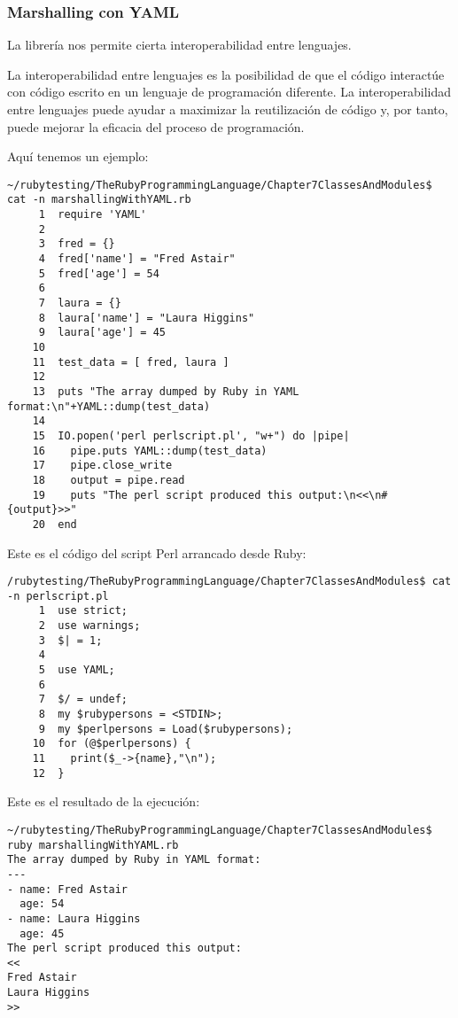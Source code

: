 \subsubsection{Marshalling con YAML}
\label{section:YAML}

La librería  nos permite cierta interoperabilidad entre lenguajes.

La interoperabilidad entre lenguajes es la posibilidad de que el código interactúe con código escrito en un lenguaje de programación diferente. 
La interoperabilidad entre lenguajes puede ayudar a maximizar la reutilización de código y, por tanto, puede mejorar la eficacia del proceso de programación.

Aquí tenemos un ejemplo:

\begin{verbatim}
~/rubytesting/TheRubyProgrammingLanguage/Chapter7ClassesAndModules$ cat -n marshallingWithYAML.rb 
     1  require 'YAML'
     2  
     3  fred = {}
     4  fred['name'] = "Fred Astair"
     5  fred['age'] = 54
     6  
     7  laura = {}
     8  laura['name'] = "Laura Higgins"
     9  laura['age'] = 45
    10  
    11  test_data = [ fred, laura ]
    12  
    13  puts "The array dumped by Ruby in YAML format:\n"+YAML::dump(test_data)
    14  
    15  IO.popen('perl perlscript.pl', "w+") do |pipe|
    16    pipe.puts YAML::dump(test_data)
    17    pipe.close_write  
    18    output = pipe.read
    19    puts "The perl script produced this output:\n<<\n#{output}>>"
    20  end
\end{verbatim}
Este es el código del script Perl arrancado desde Ruby:
\begin{verbatim}
/rubytesting/TheRubyProgrammingLanguage/Chapter7ClassesAndModules$ cat -n perlscript.pl 
     1  use strict;
     2  use warnings;
     3  $| = 1;
     4  
     5  use YAML;
     6  
     7  $/ = undef;
     8  my $rubypersons = <STDIN>;
     9  my $perlpersons = Load($rubypersons);
    10  for (@$perlpersons) {
    11    print($_->{name},"\n");
    12  }
\end{verbatim}
Este es el resultado de la ejecución:
\begin{verbatim}
~/rubytesting/TheRubyProgrammingLanguage/Chapter7ClassesAndModules$ ruby marshallingWithYAML.rb 
The array dumped by Ruby in YAML format:
--- 
- name: Fred Astair
  age: 54
- name: Laura Higgins
  age: 45
The perl script produced this output:
<<
Fred Astair
Laura Higgins
>>
\end{verbatim}

